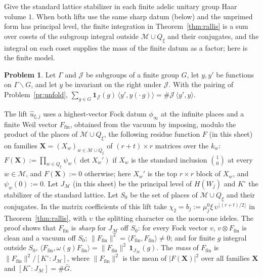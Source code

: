 \documentclass[reqno]{amsart}
\theoremstyle{definition}
\newtheorem{problem}{Problem}[section]
\theoremstyle{plain}
\newcommand{\Mch}{\mathcal{M}}
\newcommand{\uh}{\hat u}
\begin{document}
Give the standard lattice stabilizer in each finite adelic unitary group Haar volume \(1\).  When both lifts use the same sharp datum (below) and the unprimed form has principal level, the finite integration in Theorem~\ref{thm:rallis} is a sum over cosets of the subgroup integral outside \(\Mch \cup Q_\xi\) and their conjugates, and the integral on each coset supplies the mass of the finite datum as a factor; here is the finite model.

\begin{problem}\label{pr:collapse}
Let \(\Gamma\) and \(\mathcal J\) be subgroups of a finite group \(G\), let \(y, y'\) be functions on \(\Gamma\backslash G\), and let \(y\) be invariant on the right under \(\mathcal J\).  With the pairing of Problem~\ref{pr:unfold}, \(\sum_{g \in G} \mathbf 1_{\mathcal J}(g)\, \langle y', y(\cdot\, g)\rangle = \#\mathcal J\, \langle y', y\rangle\).
\end{problem}

The lift \(\uh_{\xi,j}\) uses a highest-vector Fock datum \(\phi_\infty\) at the infinite places and a finite Weil vector \(F_{\mathrm{fin}}\), obtained from the vacuum by imposing, modulo the product of the places of \(\Mch \cup Q_\xi\), the following residue function \(F\) (in this sheet) on families \(\mathbf X = (X_w)_{w \in \Mch \cup Q_\xi}\) of \((r+t) \times r\) matrices over the \(k_w\): \(F(\mathbf X) := \prod_{w \in Q_\xi} \psi_w(\det X_w')\) if \(X_w\) is the standard inclusion \(\binom{1}{0}\) at every \(w \in \Mch\), and \(F(\mathbf X) := 0\) otherwise; here \(X_w'\) is the top \(r \times r\) block of \(X_w\), and \(\psi_w(0) := 0\).  Let \(J_{\Mch}\) (in this sheet) be the principal level of \(H(W_j)\) and \(K^\circ\) the stabilizer of the standard lattice.  Let \(S_0\) be the set of places of \(\Mch \cup Q_\xi\) and their conjugates.  In the matrix coefficients of this lift take \(\chi_2 = b_j := \mu_j^0\xi\,\upsilon^{\lfloor (r+t)/2\rfloor}\) in Theorem~\ref{thm:rallis}, with \(\upsilon\) the splitting character on the norm-one ideles.  The proof shows that \(F_{\mathrm{fin}}\) is \emph{sharp} for \(J_{\Mch}\) off \(S_0\): for every Fock vector \(v\), \(v \otimes F_{\mathrm{fin}}\) is clean and a vacuum off \(S_0\); \(\lVert F_{\mathrm{fin}}\rVert^2 = \langle F_{\mathrm{fin}}, F_{\mathrm{fin}}\rangle \ne 0\); and for finite \(g\) integral outside \(S_0\), \(\langle F_{\mathrm{fin}}, \omega(g) F_{\mathrm{fin}}\rangle = \lVert F_{\mathrm{fin}}\rVert^2\, \mathbf 1_{J_{\Mch}}(g)\).  The \emph{mass} of \(F_{\mathrm{fin}}\) is \(\lVert F_{\mathrm{fin}}\rVert^2/[K^\circ : J_{\Mch}]\), where \(\lVert F_{\mathrm{fin}}\rVert^2\) is the mean of \(\lvert F(\mathbf X)\rvert^2\) over all families \(\mathbf X\) and \([K^\circ : J_{\Mch}] = \#\bar G\).
\end{document}
